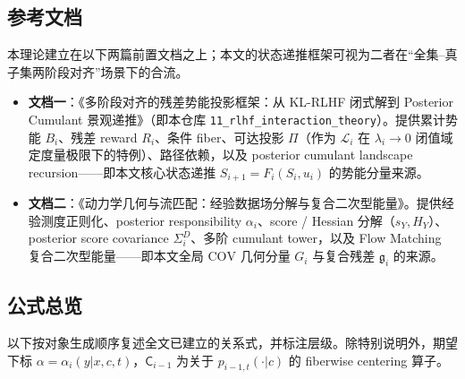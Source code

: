 \documentclass[11pt,a4paper]{article}
\newcommand{\cL}{\mathcal{L}}   %
\newcommand{\Center}{\mathsf{C}}    %
\newcommand{\ProjectOp}{\Pi}        %
\newcommand{\COV}{\mathrm{COV}}     %
\newcommand{\gres}{\bm{\mathfrak{g}}} %
\begin{document}
\subsection{参考文档}\label{s14:refs}

本理论建立在以下两篇前置文档之上；本文的状态递推框架可视为二者在“全集--真子集两阶段对齐”场景下的合流。

\begin{itemize}
\item \textbf{文档一}：《多阶段对齐的残差势能投影框架：从 KL-RLHF 闭式解到 Posterior Cumulant 景观递推》（即本仓库 \texttt{11\_rlhf\_interaction\_theory}）。提供累计势能 $B_i$、残差 reward $R_i$、条件 fiber、可达投影 $\ProjectOp$（作为 $\cL_i$ 在 $\lambda_i\to0$ 闭值域定度量极限下的特例）、路径依赖，以及 posterior cumulant landscape recursion——即本文核心状态递推 $S_{i+1}=F_i(S_i,u_i)$ 的势能分量来源。
\item \textbf{文档二}：《动力学几何与流匹配：经验数据场分解与复合二次型能量》。提供经验测度正则化、posterior responsibility $\alpha_i$、score / Hessian 分解（$s_Y,H_Y$）、posterior score covariance $\Sigma_i^D$、多阶 cumulant tower，以及 Flow Matching 复合二次型能量——即本文全局 $\COV$ 几何分量 $G_i$ 与复合残差 $\gres_i$ 的来源。
\end{itemize}

\subsection{公式总览}\label{s14:formulas}

以下按对象生成顺序复述全文已建立的关系式，并标注层级。除特别说明外，期望下标 $\alpha=\alpha_i(y|x,c,t)$，$\Center_{i-1}$ 为关于 $p_{i-1,t}(\cdot|c)$ 的 fiberwise centering 算子。
\end{document}
